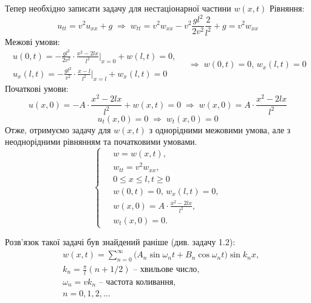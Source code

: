 Тепер необхідно записати задачу для нестаціонарної частини $w(x,t)$
Рівняння:
\begin{equation*}
    u_{tt} = v^2 u_{xx} + g
    \;\Rightarrow\;
    w_{tt} = v^2w_{xx} - v^2 \frac{gl^2}{2v^2}\frac{2}{l^2} + g = v^2w_{xx}
\end{equation*}
Межові умови:
\begin{equation*}
    \begin{aligned}
        u(0,t) = -\frac{gl^2}{2v^2} \cdot \frac{x^2 - 2lx}{l^2}\bigg|_{x=0} + w(l,t) = 0,\\
        u_x(l,t) = -\frac{gl^2}{v^2} \cdot \frac{x - l}{l^2}\bigg|_{x=l} + w_x(l,t) = 0
    \end{aligned}
        \quad\Rightarrow\; 
        w(0,t) = 0,\, w_x(l,t) = 0
\end{equation*}
Початкові умови:
\begin{equation*}
    u(x,0) = -A \cdot \frac{x^2 - 2lx}{l^2} + w(x,t) = 0
    \;\Rightarrow\;
    w(x,0) = A \cdot \frac{x^2 - 2lx}{l^2}
\end{equation*}
\begin{equation*}
    u_t(x,0) = 0
    \;\Rightarrow\;
    w_t(x,0) = 0
\end{equation*}
Отже, отримуємо задачу для $w(x,t)$ з однорідними межовими умова, але з неоднорідними рівнянням та початковими умовами.
\begin{equation} 
    \left\{ \begin{aligned} 
            \;&w = w(x,t), \\
            &w_{tt} = v^2 w_{xx}, \\
            &0 \leq x \leq l, t \geq 0 \\
            &w(0,t) = 0, \, w_x(l,t) = 0, \\
            &w(x,0) = A \cdot \frac{x^2 - 2lx}{l^2},\\
            &w_t(x,0) = 0.
    \end{aligned} \right.
\end{equation}

Розв'язок такої задачі був знайдений раніше (див. задачу 1.2):
\begin{equation}
    \begin{aligned}
        &w(x,t) = \sum_{n=0}^{\infty} \big(A_n\sin\omega_nt + B_n\cos\omega_nt \big) \sin k_nx,\\
        &k_n = \frac{\pi}{l}(n + 1/2) \text{ -- хвильове число},\\
        &\omega_n = v k_n \text{ -- частота коливання},\\
        &n = 0, 1, 2, \ldots        
    \end{aligned}
\end{equation}

